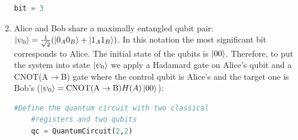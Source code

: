 \documentclass[12pt]{article}
\begin{document}
\begin{appendices}
\begin{enumerate}
\begin{lstlisting}[language=Python]
    bit = 3
    \end{lstlisting}

    \item Alice and Bob share a maximally entangled qubit pair: $\ket{\psi_0} = \frac{1}{\sqrt{2}}(\ket{0_A0_B} + \ket{1_A1_B})$. In this notation the most significant bit corresponds to Alice. The initial state of the qubits is $\ket{00}$. Therefore, to put the system into state $\ket{\psi_0}$ we apply a Hadamard gate on Alice's qubit and a CNOT(A$\rightarrow$B) gate where the control qubit is Alice's and the target one is Bob's ($\ket{\psi_0} = \textrm{CNOT(A} \rightarrow \textrm{B)} H(A)\ket{00}$):
    \begin{lstlisting}[language=Python]
    #Define the quantum circuit with two classical 
    #registers and two qubits
    qc = QuantumCircuit(2,2)
    

\end{lstlisting}
\end{enumerate}
\end{appendices}
\end{document}
